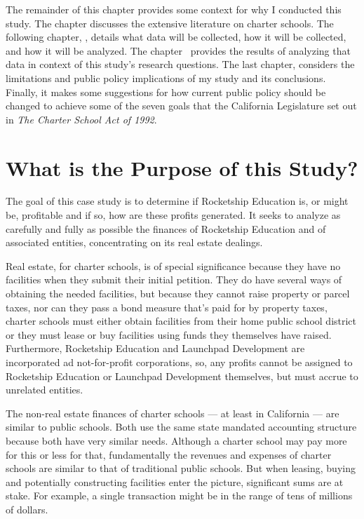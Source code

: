 The remainder of this chapter provides some context for why I conducted this study. The chapter \textit{} discusses the extensive literature on charter schools. The following chapter, \textit{}, details what data will be collected, how it will be collected, and how it will be analyzed. The chapter~\textit{} provides the results of analyzing that data in context of this study's research questions. The last chapter, \textit{} considers the limitations and public policy implications of my study and its conclusions. Finally, it makes some suggestions for how current public policy should be changed to achieve some of the seven goals that the California Legislature set out in \textit{The Charter School Act of 1992}.

\section{What is the Purpose of this Study?}\indent

The goal of this case study is to determine if Rocketship Education is, or might be, profitable and if so, how are these profits generated. It seeks to analyze as carefully and fully as possible the finances of Rocketship Education and of associated entities, concentrating on its real estate dealings.

Real estate, for charter schools, is of special significance because they have no facilities when they submit their initial petition. They do have several ways of obtaining the needed facilities, but because they cannot raise property or parcel taxes, nor can they pass a bond measure that's paid for by property taxes, charter schools must either obtain facilities from their home public school district or they must lease or buy facilities using funds they themselves have raised. Furthermore, Rocketship Education and Launchpad Development are incorporated ad not-for-profit corporations, so, any profits cannot be assigned to Rocketship Education or Launchpad Development themselves, but must accrue to unrelated entities.

The non-real estate finances of charter schools — at least in California — are similar to public schools. Both use the same state mandated accounting structure because both have very similar needs. Although a charter school may pay more for this or less for that, fundamentally the revenues and expenses of charter schools are similar to that of traditional public schools. But when leasing, buying and potentially constructing facilities  enter the picture, significant sums are at stake. For example, a single transaction might be in the range of tens of millions of dollars.

